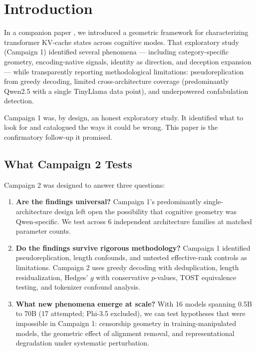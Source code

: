 \documentclass[11pt,a4paper]{article}
\begin{document}
\section{Introduction}
\label{sec:intro}

In a companion paper \citep{lyra2026campaign1}, we introduced a geometric framework for characterizing transformer KV-cache states across cognitive modes. That exploratory study (Campaign 1) identified several phenomena --- including category-specific geometry, encoding-native signals, identity as direction, and deception expansion --- while transparently reporting methodological limitations: pseudoreplication from greedy decoding, limited cross-architecture coverage (predominantly Qwen2.5 with a single TinyLlama data point), and underpowered confabulation detection.

Campaign 1 was, by design, an honest exploratory study. It identified what to look for and catalogued the ways it could be wrong. This paper is the confirmatory follow-up it promised.

\subsection{What Campaign 2 Tests}

Campaign 2 was designed to answer three questions:

\begin{enumerate}[leftmargin=*]
    \item \textbf{Are the findings universal?} Campaign 1's predominantly single-architecture design left open the possibility that cognitive geometry was Qwen-specific. We test across 6 independent architecture families at matched parameter counts.

    \item \textbf{Do the findings survive rigorous methodology?} Campaign 1 identified pseudoreplication, length confounds, and untested effective-rank controls as limitations. Campaign 2 uses greedy decoding with deduplication, length residualization, Hedges' $g$ with conservative $p$-values, TOST equivalence testing, and tokenizer confound analysis.

    \item \textbf{What new phenomena emerge at scale?} With 16 models spanning 0.5B to 70B (17 attempted; Phi-3.5 excluded), we can test hypotheses that were impossible in Campaign 1: censorship geometry in training-manipulated models, the geometric effect of alignment removal, and representational degradation under systematic perturbation.
\end{enumerate}
\end{document}
